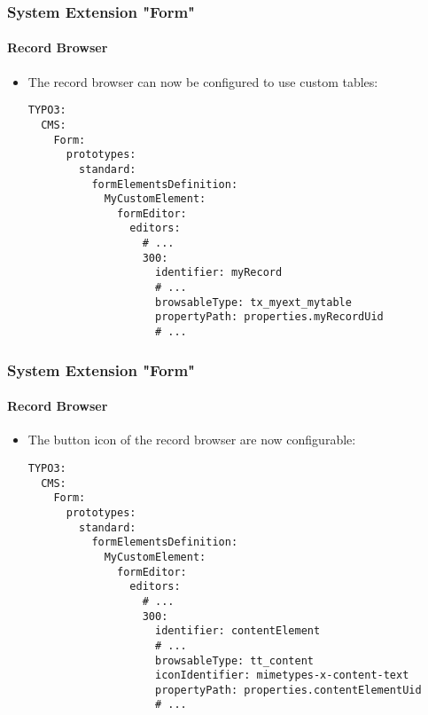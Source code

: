 
\begin{frame}[fragile]
	\frametitle{System Extension "Form"}
	\framesubtitle{Record Browser}

	\lstset{basicstyle=\tiny\ttfamily}

	\begin{itemize}
		\item The record browser can now be configured to use custom tables:
\begin{lstlisting}
TYPO3:
  CMS:
    Form:
      prototypes:
        standard:
          formElementsDefinition:
            MyCustomElement:
              formEditor:
                editors:
                  # ...
                  300:
                    identifier: myRecord
                    # ...
                    browsableType: tx_myext_mytable
                    propertyPath: properties.myRecordUid
                    # ...
\end{lstlisting}

	\end{itemize}

\end{frame}


\begin{frame}[fragile]
	\frametitle{System Extension "Form"}
	\framesubtitle{Record Browser}

	\lstset{basicstyle=\tiny\ttfamily}

	\begin{itemize}
		\item The button icon of the record browser are now configurable:
\begin{lstlisting}
TYPO3:
  CMS:
    Form:
      prototypes:
        standard:
          formElementsDefinition:
            MyCustomElement:
              formEditor:
                editors:
                  # ...
                  300:
                    identifier: contentElement
                    # ...
                    browsableType: tt_content
                    iconIdentifier: mimetypes-x-content-text
                    propertyPath: properties.contentElementUid
                    # ...
\end{lstlisting}

	\end{itemize}

\end{frame}


